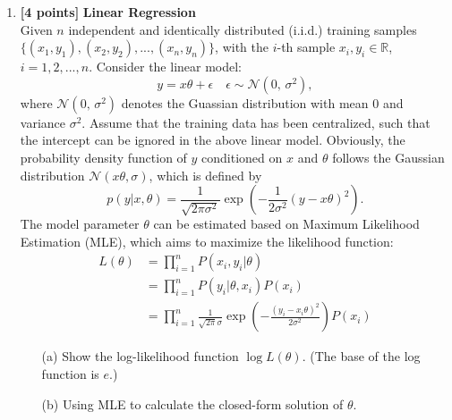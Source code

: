 \documentclass[10pt]{article}
\begin{document}
\begin{enumerate}
	\item \textbf{[4 points]} \textbf{Linear Regression} \\
	      Given $n$ independent and identically distributed (i.i.d.) training samples
	      $\{(x_1, y_1), (x_2, y_2), ... , (x_n, y_n)\}$, with the $i$-th sample $x_i, y_i \in \mathbb{R}$, $i=1,2,...,n$.
	      Consider the linear model:
	      \begin{equation}
		      y = x\theta + \epsilon \quad \epsilon\sim\mathcal{N}(0,\,\sigma^{2}),
	      \end{equation}
	      where $\mathcal{N}(0,\,\sigma^{2})$ denotes the Guassian distribution with mean 0 and variance $\sigma^2$.
	      Assume that the training data has been centralized, such that the intercept can be ignored in the above linear model.
	      Obviously, the probability density function of $y$ conditioned on $x$ and $\theta$ follows the Gaussian distribution $\mathcal{N}(x\theta,\sigma)$,
	      which is defined by
	      \begin{equation}
		      p(y|x,\theta) = \frac{1}{\sqrt{2\pi\sigma^2}}\exp(-\frac{1}{2\sigma^2}(y-x\theta)^2).
	      \end{equation}
	      The model parameter $\theta$ can be estimated based on Maximum Likelihood Estimation (MLE), which aims to maximize the likelihood function:
	      \begin{align}
		      L(\theta) & = \prod_{i=1}^n P(x_i,y_i|\theta) \nonumber                                                   \\
		                & = \prod_{i=1}^n P(y_i|\theta, x_i)P(x_i) \nonumber                                            \\
		                & = \prod_{i=1}^n \frac{1}{\sqrt{2\pi}\sigma}\exp(-\frac{(y_i - x_i\theta)^2}{2\sigma^2})P(x_i)
	      \end{align}
	      \begin{itemize}
		      \item[(a)] Show the log-likelihood function $\log L(\theta)$. (The base of the log function is $e$.)
		      \item[(b)] Using MLE to calculate the closed-form solution of $\theta$.
	      \end{itemize}


\end{enumerate}
\end{document}
